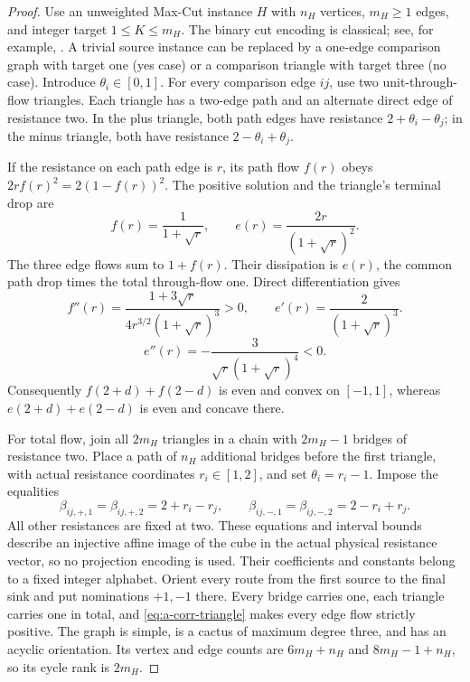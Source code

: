 \begin{proof}
Use an unweighted Max-Cut instance $H$ with $n_H$ vertices, $m_H\ge1$
edges, and integer target $1\le K\le m_H$. The binary cut encoding is
classical; see, for example,
\citet[Section 1.1]{delpia2017-miqp-np}. A trivial source instance can
be replaced by a one-edge comparison graph with target one (yes case)
or a comparison triangle with target three (no case).
Introduce $\theta_i\in[0,1]$. For every comparison edge $ij$, use two
unit-through-flow triangles. Each triangle has a two-edge path and an
alternate direct edge of resistance two. In the plus triangle, both path
edges have resistance $2+\theta_i-\theta_j$; in the minus triangle, both
have resistance $2-\theta_i+\theta_j$.

If the resistance on each path edge is $r$, its path flow $f(r)$ obeys
$2rf(r)^2=2(1-f(r))^2$. The positive solution and the triangle's terminal
drop are
\begin{equation}
 f(r)=\frac1{1+\sqrt r},\qquad
 e(r)=\frac{2r}{(1+\sqrt r)^2}.
 \label{eq:a-corr-triangle}
\end{equation}
The three edge flows sum to $1+f(r)$. Their dissipation is $e(r)$,
the common path drop times the total through-flow one. Direct
differentiation gives
\[
 f''(r)=\frac{1+3\sqrt r}{4r^{3/2}(1+\sqrt r)^3}>0,
 \qquad e'(r)=\frac2{(1+\sqrt r)^3}.
\]
\[
 e''(r)=-\frac3{\sqrt r(1+\sqrt r)^4}<0.
\]
Consequently $f(2+d)+f(2-d)$ is even and convex on $[-1,1]$, whereas
$e(2+d)+e(2-d)$ is even and concave there.

For total flow, join all $2m_H$ triangles in a chain with $2m_H-1$
bridges of resistance two. Place a path of $n_H$ additional bridges
before the first triangle, with actual resistance coordinates
$r_i\in[1,2]$, and set $\theta_i=r_i-1$. Impose the equalities
\[
 \beta_{ij,+,1}=\beta_{ij,+,2}=2+r_i-r_j,
 \qquad
 \beta_{ij,-,1}=\beta_{ij,-,2}=2-r_i+r_j.
\]
All other resistances are fixed at two. These equations and interval
bounds describe an injective affine image of the cube in the actual
physical resistance vector, so no projection encoding is used. Their
coefficients and constants belong to a fixed integer alphabet.
Orient every route from the first source to the final sink and put
nominations $+1,-1$ there. Every bridge carries one, each triangle
carries one in total, and \cref{eq:a-corr-triangle} makes every edge
flow strictly positive. The graph is simple, is a cactus of maximum
degree three, and has an acyclic orientation. Its vertex and edge
counts are $6m_H+n_H$ and $8m_H-1+n_H$, so its cycle rank is $2m_H$.


\end{proof}
